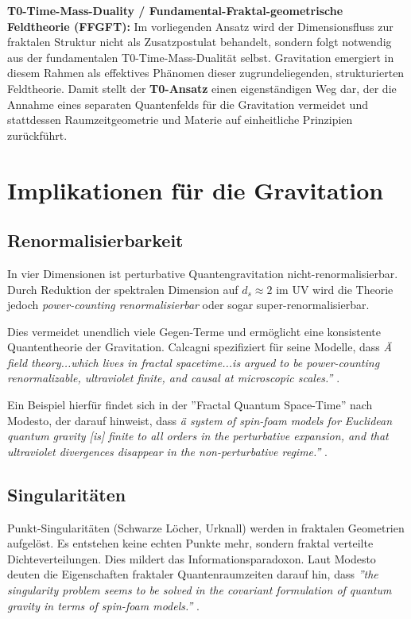 	\textbf{T0-Time-Mass-Duality / Fundamental-Fraktal-geometrische Feldtheorie (FFGFT):} Im vorliegenden Ansatz wird der Dimensionsfluss zur fraktalen Struktur nicht als Zusatzpostulat behandelt, sondern folgt notwendig aus der fundamentalen T0-Time-Mass-Dualität selbst. Gravitation emergiert in diesem Rahmen als effektives Phänomen dieser zugrundeliegenden, strukturierten Feldtheorie. Damit stellt der \textbf{T0-Ansatz} einen eigenständigen Weg dar, der die Annahme eines separaten Quantenfelds für die Gravitation vermeidet und stattdessen Raumzeitgeometrie und Materie auf einheitliche Prinzipien zurückführt.
	
	\section{Implikationen für die Gravitation}
	
	\subsection{Renormalisierbarkeit}
	In vier Dimensionen ist perturbative Quantengravitation nicht-renormalisierbar. Durch Reduktion der spektralen Dimension auf $d_s \approx 2$ im UV wird die Theorie jedoch \emph{power-counting renormalisierbar} oder sogar super-renormalisierbar.
	
	Dies vermeidet unendlich viele Gegen-Terme und ermöglicht eine konsistente Quantentheorie der Gravitation. Calcagni spezifiziert für seine Modelle, dass \textit{Ä field theory...which lives in fractal spacetime...is argued to be power-counting renormalizable, ultraviolet finite, and causal at microscopic scales.''} \cite{Calcagni2010a}.
	
	Ein Beispiel hierfür findet sich in der ''Fractal Quantum Space-Time'' nach Modesto, der darauf hinweist, dass \textit{ä system of spin-foam models for Euclidean quantum gravity [is] finite to all orders in the perturbative expansion, and that ultraviolet divergences disappear in the non-perturbative regime.''} \cite{Modesto2009}.
	
	\subsection{Singularitäten}
	Punkt-Singularitäten (Schwarze Löcher, Urknall) werden in fraktalen Geometrien aufgelöst. Es entstehen keine echten Punkte mehr, sondern fraktal verteilte Dichteverteilungen. Dies mildert das Informationsparadoxon. Laut Modesto deuten die Eigenschaften fraktaler Quantenraumzeiten darauf hin, dass \textit{''the singularity problem seems to be solved in the covariant formulation of quantum gravity in terms of spin-foam models.''} \cite{Modesto2009}.
	
